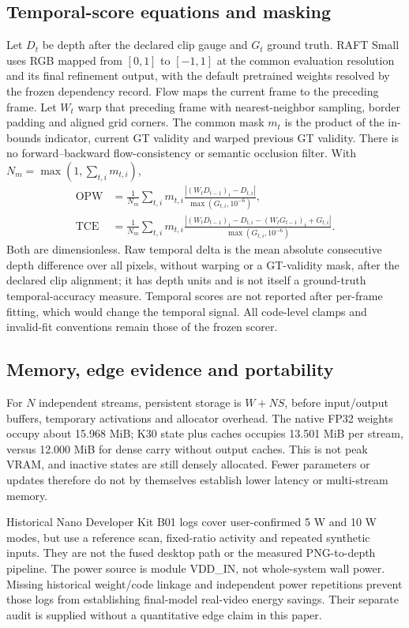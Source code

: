 \subsection{Temporal-score equations and masking}
Let $D_t$ be depth after the declared clip gauge and $G_t$ ground truth.
RAFT Small uses RGB mapped from $[0,1]$ to $[-1,1]$ at the common evaluation
resolution and its final refinement output, with the default pretrained
weights resolved by the frozen dependency record. Flow maps the current
frame to the preceding frame. Let $W_t$ warp that preceding frame with
nearest-neighbor sampling, border padding and aligned grid corners.
The common mask $m_t$ is the product of the in-bounds indicator, current
GT validity and warped previous GT validity. There is no forward--backward
flow-consistency or semantic occlusion filter. With $N_m=\max(1,\sum_{t,i}m_{t,i})$,
\begin{align}
 \mathrm{OPW}&=\frac{1}{N_m}\sum_{t,i}m_{t,i}
  \frac{|(W_tD_{t-1})_i-D_{t,i}|}{\max(G_{t,i},10^{-6})},\\
 \mathrm{TCE}&=\frac{1}{N_m}\sum_{t,i}m_{t,i}
  \frac{|(W_tD_{t-1})_i-D_{t,i}-(W_tG_{t-1})_i+G_{t,i}|}
       {\max(G_{t,i},10^{-6})}.
\end{align}
Both are dimensionless. Raw temporal delta is the mean absolute consecutive
depth difference over all pixels, without warping or a GT-validity mask,
after the declared clip alignment; it has depth units and is not itself a
ground-truth temporal-accuracy measure. Temporal scores are not reported after
per-frame fitting, which would change the temporal signal. All code-level
clamps and invalid-fit conventions remain those of the frozen scorer.

\subsection{Memory, edge evidence and portability}
For $N$ independent streams, persistent storage is $W+NS$, before input/output
buffers, temporary activations and allocator overhead. The native FP32 weights
occupy about 15.968 MiB; K30 state plus caches occupies 13.501 MiB per stream,
versus 12.000 MiB for dense carry without output caches. This is not peak VRAM,
and inactive states are still densely allocated. Fewer parameters or updates
therefore do not by themselves establish lower latency or multi-stream memory.

Historical Nano Developer Kit B01 logs cover user-confirmed 5 W and 10 W modes,
but use a reference scan, fixed-ratio activity and repeated synthetic inputs.
They are not the fused desktop path or the measured PNG-to-depth pipeline.
The power source is module VDD\_IN, not whole-system wall power. Missing
historical weight/code linkage and independent power repetitions prevent
those logs from establishing final-model real-video energy savings. Their
separate audit is supplied without a quantitative edge claim in this paper.

